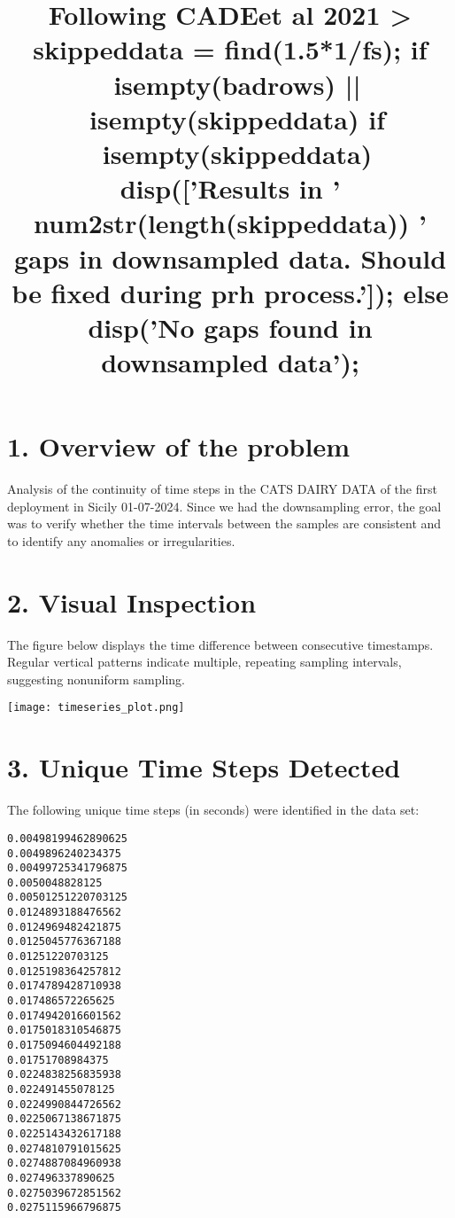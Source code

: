 \documentclass[12pt]{article}
\title{\small{Following CADEet al 2021 > skippeddata = find(1.5*1/fs);
    if ~isempty(badrows) || ~isempty(skippeddata)
        if ~isempty(skippeddata)
            disp(['Results in ' num2str(length(skippeddata)) ' gaps in downsampled data.  Should be fixed during prh process.']);
        else
            disp('No gaps found in downsampled data');}}
\begin{document}
\maketitle

\section*{\small{1. Overview of the problem}}
Analysis of the continuity of time steps in the CATS DAIRY DATA of the first deployment in Sicily 01-07-2024. Since we had the downsampling error, the goal was to verify whether the time intervals between the samples are consistent and to identify any anomalies or irregularities. 

\section*{\small{2. Visual Inspection}}
The figure below displays the time difference between consecutive timestamps. Regular vertical patterns indicate multiple, repeating sampling intervals, suggesting nonuniform sampling.

\begin{center}
\texttt{[image: timeseries\_plot.png]}
\end{center}

\section*{\small{3. Unique Time Steps Detected}}
The following unique time steps (in seconds) were identified in the data set:

\begin{verbatim}
0.00498199462890625
0.0049896240234375
0.00499725341796875
0.0050048828125
0.00501251220703125
0.0124893188476562
0.0124969482421875
0.0125045776367188
0.01251220703125
0.0125198364257812
0.0174789428710938
0.017486572265625
0.0174942016601562
0.0175018310546875
0.0175094604492188
0.01751708984375
0.0224838256835938
0.022491455078125
0.0224990844726562
0.0225067138671875
0.0225143432617188
0.0274810791015625
0.0274887084960938
0.027496337890625
0.0275039672851562
0.0275115966796875
\end{verbatim}
\end{document}
